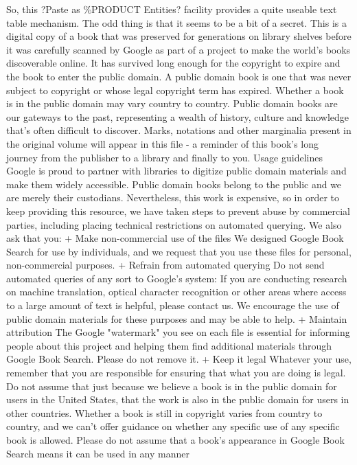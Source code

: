 \documentclass[a4paper]{article}
\begin{document}
{So, this ?Paste as \%PRODUCT Entities? facility provides a quite useable text table mechanism. The odd thing is that it seems to be a bit of a secret.
This is a digital copy of a book that was preserved for generations on library shelves before it was carefully scanned by Google as part of a project 
to make the world's books discoverable online. 
It has survived long enough for the copyright to expire and the book to enter the public domain. A public domain book is one that was never subject 
to copyright or whose legal copyright term has expired. Whether a book is in the public domain may vary country to country. Public domain books 
are our gateways to the past, representing a wealth of history, culture and knowledge that's often difficult to discover. 
Marks, notations and other marginalia present in the original volume will appear in this file - a reminder of this book's long journey from the 
publisher to a library and finally to you. 
Usage guidelines 
Google is proud to partner with libraries to digitize public domain materials and make them widely accessible. Public domain books belong to the 
public and we are merely their custodians. Nevertheless, this work is expensive, so in order to keep providing this resource, we have taken steps to 
prevent abuse by commercial parties, including placing technical restrictions on automated querying. 
We also ask that you: 
+ Make non-commercial use of the files We designed Google Book Search for use by individuals, and we request that you use these files for 
personal, non-commercial purposes. 
+ Refrain from automated querying Do not send automated queries of any sort to Google's system: If you are conducting research on machine 
translation, optical character recognition or other areas where access to a large amount of text is helpful, please contact us. We encourage the 
use of public domain materials for these purposes and may be able to help. 
+ Maintain attribution The Google "watermark" you see on each file is essential for informing people about this project and helping them find 
additional materials through Google Book Search. Please do not remove it. 
+ Keep it legal Whatever your use, remember that you are responsible for ensuring that what you are doing is legal. Do not assume that just 
because we believe a book is in the public domain for users in the United States, that the work is also in the public domain for users in other 
countries. Whether a book is still in copyright varies from country to country, and we can't offer guidance on whether any specific use of 
any specific book is allowed. Please do not assume that a book's appearance in Google Book Search means it can be used in any manner 
}
\end{document}
